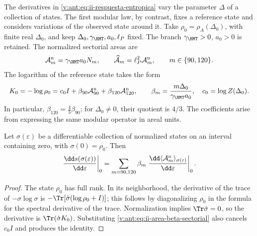 The derivatives in \eqref{v:ant:eq:ii-respuesta-entropica} vary the parameter
\(\Delta\) of a collection of states. The first modular law, by contrast, fixes
a reference state and considers variations of the observed state
around it. Take
\(\rho_0=\rho_A(\Delta_0)\), with finite real \(\Delta_0\),
and keep \(\Delta_0,\gamma_{\HMT},a_0,\ell_P\) fixed.
The branch \(\gamma_{\HMT}>0\), \(a_0>0\) is retained.
The normalized sectorial areas are
\begin{equation}
 \mathcal A_m^{\rm n}=\gamma_{\HMT}a_0N_m,
 \qquad
 \widehat{\mathcal A}_m=\ell_P^2\mathcal A_m^{\rm n},
 \qquad m\in\{90,120\}.
 \label{v:ant:eq:ii-area-sector-normalizado}
\end{equation}
The logarithm of the reference state takes the form
\begin{equation}
 K_0=-\log\rho_0
 =c_0I+\beta_{90}\mathcal A_{90}^{\rm n}
         +\beta_{120}\mathcal A_{120}^{\rm n},
 \qquad
 \beta_m=\frac{m\Delta_0}{\gamma_{\HMT}a_0},
 \quad c_0=\log Z(\Delta_0).
 \label{v:ant:eq:ii-area-beta-sectorial}
\end{equation}
In particular, \(\beta_{120}=\tfrac43\beta_{90}\); for
\(\Delta_0\ne0\), their quotient is \(4/3\). The coefficients
arise from expressing the same modular operator in areal units.

\begin{theorem}
\label{v:ant:thm:ii-area-primera-ley}
Let \(\sigma(\varepsilon)\) be a differentiable collection of normalized
states on an interval containing zero, with
\(\sigma(0)=\rho_0\). Then
\begin{equation}
 \left.\frac{\dd s(\sigma(\varepsilon))}{\dd\varepsilon}\right|_0
 =\sum_{m=90,120}\beta_m
   \left.\frac{\dd\langle\mathcal A_m^{\rm n}\rangle_
                       {\sigma(\varepsilon)}}{\dd\varepsilon}\right|_0.
 \label{v:ant:eq:ii-area-primera-ley}
\end{equation}
\end{theorem}
\begin{proof}
The state \(\rho_0\) has full rank. In its neighborhood, the derivative
of the trace of \(-\sigma\log\sigma\) is
\(-\Tr[\dot\sigma(\log\rho_0+I)]\); this follows by diagonalizing
\(\rho_0\) in the formula for the spectral derivative of the trace.
Normalization implies \(\Tr\dot\sigma=0\), so the
derivative is \(\Tr(\dot\sigma K_0)\). Substituting
\eqref{v:ant:eq:ii-area-beta-sectorial} also cancels \(c_0I\) and
produces the identity.
\end{proof}

